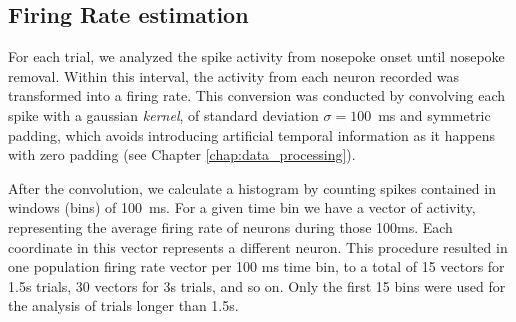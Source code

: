 \subsection{Firing Rate estimation}
\label{subsec:fr_estimation}
    

    For each trial, we analyzed the spike activity from nosepoke onset until nosepoke removal. Within this interval, the activity from each neuron recorded was transformed into a firing rate. This conversion was conducted by convolving each spike with a gaussian \textit{kernel}, of standard deviation $\sigma = 100$~ms and symmetric padding, which avoids introducing artificial temporal information as it happens with zero padding (see Chapter \ref{chap:data_processing}).
    
    After the convolution, we calculate a histogram by counting spikes contained in windows (bins) of 100~ms. For a given time bin we have a vector of activity, representing the average firing rate of neurons during those 100ms. Each coordinate in this vector represents a different neuron. This procedure resulted in one population firing rate vector per 100 ms time bin, to a total of 15 vectors for 1.5s trials, 30 vectors for 3s trials, and so on. Only the first 15 bins were used for the analysis of trials longer than 1.5s.


